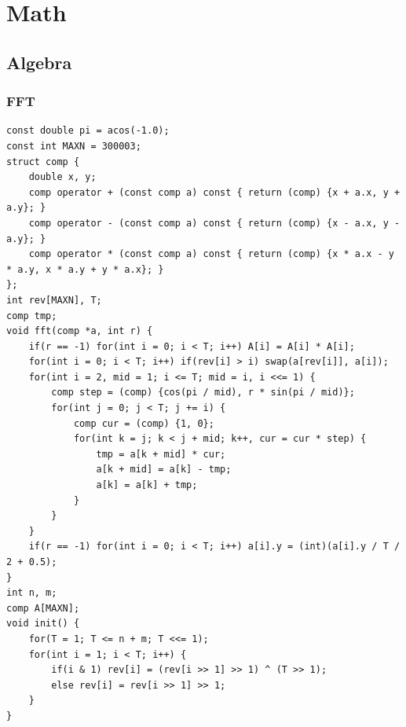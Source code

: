 \documentclass[10pt]{ctexart}
\begin{document}
{\newpage
\section{Math}
\subsection{Algebra}
\subsubsection{FFT}
\begin{lstlisting}
const double pi = acos(-1.0);
const int MAXN = 300003;
struct comp {
    double x, y;
    comp operator + (const comp a) const { return (comp) {x + a.x, y + a.y}; }
    comp operator - (const comp a) const { return (comp) {x - a.x, y - a.y}; }
    comp operator * (const comp a) const { return (comp) {x * a.x - y * a.y, x * a.y + y * a.x}; }
};
int rev[MAXN], T;
comp tmp;
void fft(comp *a, int r) {
    if(r == -1) for(int i = 0; i < T; i++) A[i] = A[i] * A[i];
    for(int i = 0; i < T; i++) if(rev[i] > i) swap(a[rev[i]], a[i]);
    for(int i = 2, mid = 1; i <= T; mid = i, i <<= 1) {
        comp step = (comp) {cos(pi / mid), r * sin(pi / mid)};
        for(int j = 0; j < T; j += i) {
            comp cur = (comp) {1, 0};
            for(int k = j; k < j + mid; k++, cur = cur * step) {
                tmp = a[k + mid] * cur;
                a[k + mid] = a[k] - tmp;
                a[k] = a[k] + tmp;
            }
        }
    }
    if(r == -1) for(int i = 0; i < T; i++) a[i].y = (int)(a[i].y / T / 2 + 0.5);
}
int n, m;
comp A[MAXN];
void init() {
    for(T = 1; T <= n + m; T <<= 1);
    for(int i = 1; i < T; i++) {
        if(i & 1) rev[i] = (rev[i >> 1] >> 1) ^ (T >> 1);
        else rev[i] = rev[i >> 1] >> 1;
    }
}
\end{lstlisting}
}
\end{document}
